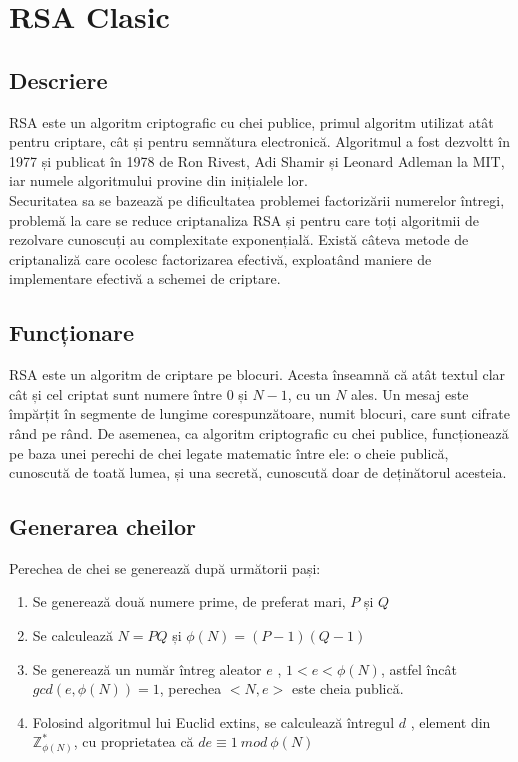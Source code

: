\documentclass[12]{article}
\begin{document}
\section{RSA Clasic}
\subsection{Descriere}
RSA este un algoritm criptografic cu chei publice, primul algoritm utilizat atât pentru criptare, cât și pentru semnătura electronică. Algoritmul a fost dezvoltt în 1977 și publicat în 1978 de Ron Rivest, Adi Shamir și Leonard Adleman la MIT, iar numele algoritmului provine din inițialele lor. \\
Securitatea sa se bazează pe dificultatea problemei factorizării numerelor întregi, problemă la care se reduce criptanaliza RSA și pentru care toți algoritmii de rezolvare cunoscuți au complexitate exponențială. Există câteva metode de criptanaliză care ocolesc factorizarea efectivă, exploatând maniere de implementare efectivă a schemei de criptare.
\subsection{Funcționare}
RSA este un algoritm de criptare pe blocuri. Acesta înseamnă că atât textul clar cât și cel criptat sunt numere între 0 și $N-1$, cu un $N$ ales. Un mesaj este împărțit în segmente de lungime corespunzătoare, numit blocuri, care sunt cifrate rând pe rând. De asemenea, ca algoritm criptografic cu chei publice, funcționează pe baza unei perechi de chei legate matematic între ele: o cheie publică, cunoscută de toată lumea, și una secretă, cunoscută doar de deținătorul acesteia.
\subsection{Generarea cheilor}
Perechea de chei se generează după următorii pași:
\begin{enumerate}
\item Se generează două numere prime, de preferat mari, $P$ și $Q$
\item Se calculează $N=PQ$ și $\phi(N)=(P-1)(Q-1)$
\item Se generează un număr întreg aleator $e$ , $1<e<\phi(N)$, astfel încât $gcd(e,\phi(N))=1$, perechea $<N,e>$ este cheia publică.
\item Folosind algoritmul lui Euclid extins, se calculează întregul $d$ , element din $\mathbb{Z}_{\phi(N)}^{*}$, cu proprietatea că $de \equiv 1 \ mod \ \phi(N)$
\end{enumerate}
\end{document}
